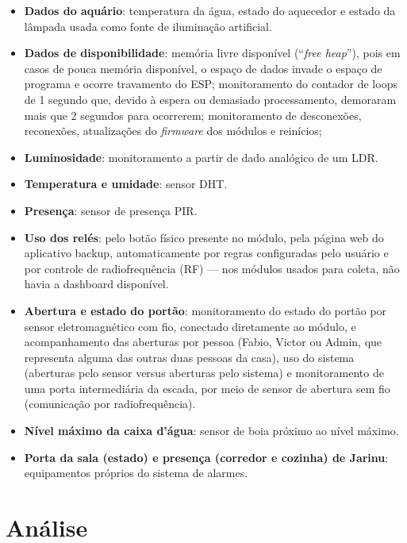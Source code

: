 \begin{itemize}
	\item \textbf{Dados do aquário}: temperatura da água, estado do aquecedor e estado da lâmpada usada como fonte de iluminação artificial.
	\item \textbf{Dados de disponibilidade}: memória livre disponível (“\emph{free heap}”), pois em casos de pouca memória disponível, o espaço de dados invade o espaço de programa e ocorre travamento do ESP; monitoramento do contador de loops de 1 segundo que, devido à espera ou demasiado processamento, demoraram mais que 2 segundos para ocorrerem; monitoramento de desconexões, reconexões, atualizações do \emph{firmware} dos módulos e reinícios;
	\item \textbf{Luminosidade}: monitoramento a partir de dado analógico de um LDR.
	\item \textbf{Temperatura e umidade}: sensor DHT.
	\item \textbf{Presença}: sensor de presença PIR.
	\item \textbf{Uso dos relés}: pelo botão físico presente no módulo, pela página web do aplicativo backup, automaticamente por regras configuradas pelo usuário e por controle de radiofrequência (RF) --- nos módulos usados para coleta, não havia a dashboard disponível.
	\item \textbf{Abertura e estado do portão}: monitoramento do estado do portão por sensor eletromagnético com fio, conectado diretamente ao módulo, e acompanhamento das aberturas por pessoa (Fabio, Victor ou Admin, que representa alguma das outras duas pessoas da casa), uso do sistema (aberturas pelo sensor versus aberturas pelo sistema) e monitoramento de uma porta intermediária da escada, por meio de sensor de abertura sem fio (comunicação por radiofrequência).
	\item \textbf{Nível máximo da caixa d’água}: sensor de boia próximo ao nível máximo.
	\item \textbf{Porta da sala (estado) e presença (corredor e cozinha) de Jarinu}: equipamentos próprios do sistema de alarmes.

\end{itemize}

\section{Análise}

